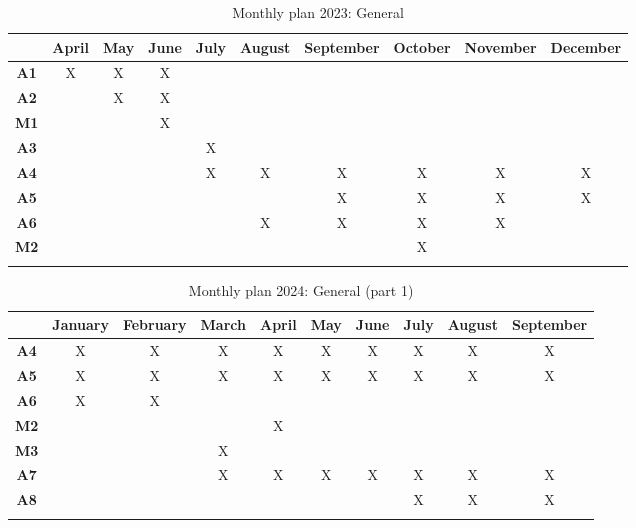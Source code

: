\begin{longtable}{|c|c|c|c|c|c|c|c|c|c|}
    \hline
    & \textbf{April}& \textbf{May} & \textbf{June} & \textbf{July} & \textbf{August} & \textbf{September} & \textbf{October} & \textbf{November} & \textbf{December} \\ \hline
    
    \textbf{A1} & X & X & X & & & & & & \\ \hline

    \textbf{A2} & & X & X & & & & & & \\ \hline

    \textbf{M1} & & & X & & & & & & \\ \hline

    \textbf{A3} & & & & X & & & & & \\ \hline

    \textbf{A4} & & & & X & X & X & X & X & X \\ \hline

    \textbf{A5} & & & & & & X & X & X & X \\ \hline

    \textbf{A6} & & & & & X & X & X & X & \\ \hline
    
    \textbf{M2} & & & & & & & X & & \\ \hline
    
    \caption{Monthly plan 2023: General} \label{tab:activity_schedule} 
\end{longtable}

\begin{longtable}{| c | c | c | c | c | c | c | c | c | c |}
    \hline
    & \textbf{January} & \textbf{February} & \textbf{March} & \textbf{April} & \textbf{May} & \textbf{June} & \textbf{July} & \textbf{August} & \textbf{September}\\ \hline
    
    \textbf{A4} & X & X & X & X & X & X & X & X & X  \\ \hline
    
    \textbf{A5} & X & X & X & X & X & X & X & X & X \\ \hline

    \textbf{A6} & X & X & & & & & & &  \\ \hline
    
    \textbf{M2} & & & & X & & & & &   \\ \hline
    
    \textbf{M3} & & & X & & & & & &  \\ \hline
    
    \textbf{A7} & & & X & X & X & X & X & X & X  \\ \hline
    
    \textbf{A8} & & & & & & & X & X & X \\ \hline
    
    \caption{Monthly plan 2024: General (part 1)} \label{tab:activity_schedule} 
\end{longtable}


